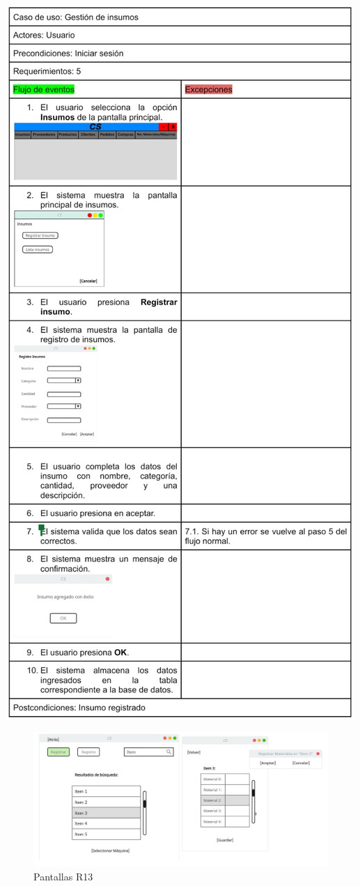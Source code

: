 \documentclass{article}
\begin{document}
    \includegraphics[width=0.9\linewidth]{imagenes/imagen_de_especificaion_muy_dificil_de_replicar_en_latex.jpg}

    \begin{figure}
        \includegraphics[width=1\linewidth]{imagenes/pan_registrar_materialespormaquina.png}
        \caption{Pantallas R13}
    \end{figure} 
    
\end{document}
